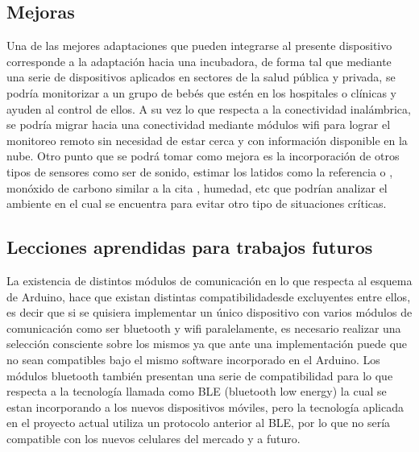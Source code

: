 \documentclass{IEEEtran}
\begin{document}
		\subsection{Mejoras}

			Una de las mejores adaptaciones que pueden integrarse al presente dispositivo corresponde a la adaptación hacia una incubadora, de forma tal que mediante una serie de dispositivos aplicados en sectores de la salud pública y privada, se podría monitorizar a un grupo de bebés que estén en los hospitales o clínicas y ayuden al control de ellos. A su vez lo que respecta a la conectividad inalámbrica, se podría migrar hacia una conectividad mediante módulos wifi para lograr el monitoreo remoto sin necesidad de estar cerca y con información disponible en la nube. Otro punto que se podrá tomar como mejora es la incorporación de otros tipos de sensores como ser de sonido, estimar los latidos como la referencia \cite{lindberg1996estimation} o \cite{scanlon1996sudden}, monóxido de carbono similar a la cita \cite{esquiroz2017diseno}, humedad, etc que podrían analizar el ambiente en el cual se encuentra para evitar otro tipo de situaciones críticas.

		\subsection{Lecciones aprendidas para trabajos futuros}
			
			La existencia de distintos módulos de comunicación en lo que respecta al esquema de Arduino, hace que existan distintas compatibilidadesde excluyentes entre ellos, es decir que si se quisiera implementar un único dispositivo con varios módulos de comunicación como ser bluetooth y wifi paralelamente, es necesario realizar una selección consciente sobre los mismos ya que ante una implementación puede que no sean compatibles bajo el mismo software incorporado en el Arduino. Los módulos bluetooth también presentan una serie de compatibilidad para lo que respecta a la tecnología llamada como BLE (bluetooth low energy) la cual se estan incorporando a los nuevos dispositivos móviles, pero la tecnología aplicada en el proyecto actual utiliza un protocolo anterior al BLE, por lo que no sería compatible con los nuevos celulares del mercado y a futuro.
\end{document}
